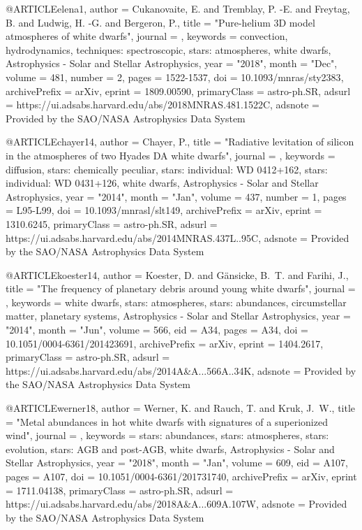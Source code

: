 \documentclass[a4paper,fleqn,usenatbib]{mnras}
\begin{document}
@ARTICLE{elena1,
       author = {{Cukanovaite}, E. and {Tremblay}, P. -E. and {Freytag}, B. and
         {Ludwig}, H. -G. and {Bergeron}, P.},
        title = "{Pure-helium 3D model atmospheres of white dwarfs}",
      journal = {\mnras},
     keywords = {convection, hydrodynamics, techniques: spectroscopic, stars: atmospheres, white dwarfs, Astrophysics - Solar and Stellar Astrophysics},
         year = "2018",
        month = "Dec",
       volume = {481},
       number = {2},
        pages = {1522-1537},
          doi = {10.1093/mnras/sty2383},
archivePrefix = {arXiv},
       eprint = {1809.00590},
 primaryClass = {astro-ph.SR},
       adsurl = {https://ui.adsabs.harvard.edu/abs/2018MNRAS.481.1522C},
      adsnote = {Provided by the SAO/NASA Astrophysics Data System}
}

@ARTICLE{chayer14,
       author = {{Chayer}, P.},
        title = "{Radiative levitation of silicon in the atmospheres of two Hyades DA white dwarfs}",
      journal = {\mnras},
     keywords = {diffusion, stars: chemically peculiar, stars: individual: WD 0412+162, stars: individual: WD 0431+126, white dwarfs, Astrophysics - Solar and Stellar Astrophysics},
         year = "2014",
        month = "Jan",
       volume = {437},
       number = {1},
        pages = {L95-L99},
          doi = {10.1093/mnrasl/slt149},
archivePrefix = {arXiv},
       eprint = {1310.6245},
 primaryClass = {astro-ph.SR},
       adsurl = {https://ui.adsabs.harvard.edu/abs/2014MNRAS.437L..95C},
      adsnote = {Provided by the SAO/NASA Astrophysics Data System}
}

@ARTICLE{koester14,
       author = {{Koester}, D. and {G{\"a}nsicke}, B.~T. and {Farihi}, J.},
        title = "{The frequency of planetary debris around young white dwarfs}",
      journal = {\aap},
     keywords = {white dwarfs, stars: atmospheres, stars: abundances, circumstellar matter, planetary systems, Astrophysics - Solar and Stellar Astrophysics},
         year = "2014",
        month = "Jun",
       volume = {566},
          eid = {A34},
        pages = {A34},
          doi = {10.1051/0004-6361/201423691},
archivePrefix = {arXiv},
       eprint = {1404.2617},
 primaryClass = {astro-ph.SR},
       adsurl = {https://ui.adsabs.harvard.edu/abs/2014A&A...566A..34K},
      adsnote = {Provided by the SAO/NASA Astrophysics Data System}
}

@ARTICLE{werner18,
       author = {{Werner}, K. and {Rauch}, T. and {Kruk}, J.~W.},
        title = "{Metal abundances in hot white dwarfs with signatures of a superionized wind}",
      journal = {\aap},
     keywords = {stars: abundances, stars: atmospheres, stars: evolution, stars: AGB and post-AGB, white dwarfs, Astrophysics - Solar and Stellar Astrophysics},
         year = "2018",
        month = "Jan",
       volume = {609},
          eid = {A107},
        pages = {A107},
          doi = {10.1051/0004-6361/201731740},
archivePrefix = {arXiv},
       eprint = {1711.04138},
 primaryClass = {astro-ph.SR},
       adsurl = {https://ui.adsabs.harvard.edu/abs/2018A&A...609A.107W},
      adsnote = {Provided by the SAO/NASA Astrophysics Data System}
}
\end{document}
